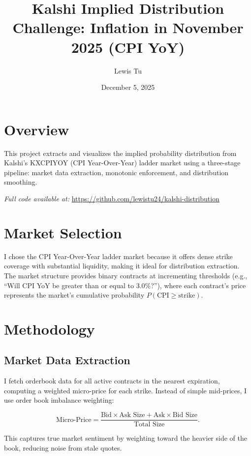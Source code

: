 \documentclass[11pt]{article}
\title{Kalshi Implied Distribution Challenge: Inflation in November 2025 (CPI YoY)}
\author{Lewis Tu}
\date{December 5, 2025}
\begin{document}
\maketitle

\section{Overview}

This project extracts and visualizes the implied probability distribution from Kalshi's KXCPIYOY (CPI Year-Over-Year) ladder market using a three-stage pipeline: market data extraction, monotonic enforcement, and distribution smoothing.

\noindent \textit{Full code available at:} \url{https://github.com/lewistu24/kalshi-distribution}


\section{Market Selection}

I chose the CPI Year-Over-Year ladder market because it offers dense strike coverage with substantial liquidity, making it ideal for distribution extraction. The market structure provides binary contracts at incrementing thresholds (e.g., ``Will CPI YoY be greater than or equal to 3.0\%?''), where each contract's price represents the market's cumulative probability $P(\text{CPI} \geq \text{strike})$.

\section{Methodology}

\subsection{Market Data Extraction}

I fetch orderbook data for all active contracts in the nearest expiration, computing a weighted micro-price for each strike. Instead of simple mid-prices, I use order book imbalance weighting:

\begin{equation*}
\text{Micro-Price} = \frac{\text{Bid} \times \text{Ask Size} + \text{Ask} \times \text{Bid Size}}{\text{Total Size}}.
\end{equation*}

\smallskip\noindent This captures true market sentiment by weighting toward the heavier side of the book, reducing noise from stale quotes.
\end{document}
